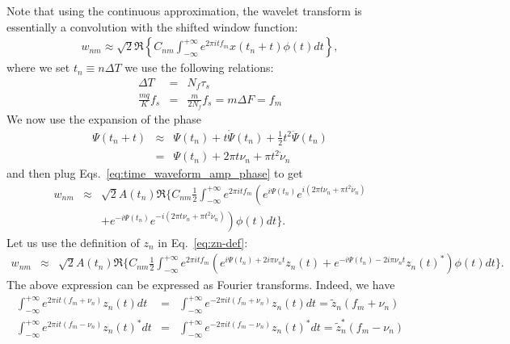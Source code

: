 \documentclass{article}
\begin{document}
Note that using the continuous approximation, the wavelet transform is essentially a convolution with the shifted window function:
\begin{eqnarray}
\label{eq:wavelet_transform_continuous}
    w_{n m} \approx \sqrt{2} \Re \left\{C_{n m} \int_{-\infty}^{+\infty} e^{2 \pi i t f_{m}} x(t_n + t) \phi(t) dt\right\},
\end{eqnarray}
where we set $t_n \equiv n \Delta T$ we use the following relations:
\begin{eqnarray}
  \Delta T &=& N_f \tau_s \label{eq:dT_tau}\\
  \frac{mq}{K}f_s &=& \frac{m}{2 N_f} f_s = m \Delta F = f_{m} \label{eq:fmq}
\end{eqnarray}
We now use the expansion of the phase
\begin{eqnarray}
\label{eq:time_waveform_expansion2}
    \Psi(t_n + t) & \approx & \Psi(t_n) + t \dot{\Psi}(t_n) + \frac{1}{2} t^2 \ddot{\Psi}(t_n) \nonumber \\
    & = & \Psi(t_n) + 2 \pi t \nu_n + \pi t^2 \dot{\nu}_n
\end{eqnarray}
and then plug Eqs.~\eqref{eq:time_waveform_amp_phase} to get
\begin{eqnarray*}
    w_{n m} & \approx & \sqrt{2}A(t_n) \Re\Big\{ C_{n m}   \frac{1}{2} \int_{-\infty}^{+\infty} e^{2 \pi i t f_{m}} \left( e^{i\Psi(t_n)}  e^{i\left(2 \pi t \nu_n + \pi t^2 \dot{\nu}_n\right)} \right. \nonumber \\
    &&  \left. + e^{-i\Psi(t_n)} e^{-i\left(2 \pi t \nu_n + \pi t^2 \dot{\nu}_n\right)} \right)\phi(t)  dt \Big\}.
\end{eqnarray*}
Let us use the definition of $z_n$ in Eq.~\eqref{eq:zn-def}:
\begin{eqnarray*}
    w_{n m} & \approx & \sqrt{2}A(t_n) \Re\Big\{ C_{n m}   \frac{1}{2} \int_{-\infty}^{+\infty} e^{2 \pi i t f_{m}} \left( e^{i\Psi(t_n)+2 i\pi \nu_n t}  z_n(t) + e^{-i\Psi(t_n)-2 i\pi \nu_n t} z_n(t)^{\ast} \right)\phi(t)  dt \Big\}.
\end{eqnarray*}
The above expression can be expressed as Fourier transforms. Indeed, we have
\begin{eqnarray*}
    \int_{-\infty}^{+\infty} e^{2 \pi i t (f_{m}+\nu_n)} z_n(t) dt &=& \int_{-\infty}^{+\infty} e^{-2 \pi i t (f_{m}+\nu_n)} z_n(t) dt = \tilde{z}_n(f_{m} +\nu_n ) \\
    \int_{-\infty}^{+\infty} e^{2 \pi i t (f_{m}-\nu_n)} z_n(t)^{\ast} dt & = & \int_{-\infty}^{+\infty} e^{-2 \pi i t (f_{m}-\nu_n)} z_n(t)^{\ast} dt 
    = \tilde{z}^{\ast}_n(f_{m}-\nu_n)
\end{eqnarray*}
\end{document}
